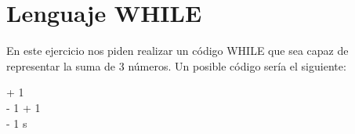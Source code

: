 \documentclass{article}
\begin{document}
\section{Lenguaje WHILE}

\begin{flushleft}
En este ejercicio nos piden realizar un código WHILE que sea capaz de representar la suma de 3 números. Un posible código sería el siguiente:
\end{flushleft}

 {
	 {
		\Assig{} + 1 \\
		\Assig{} - 1
	} 
	 {
		\Assig{} + 1 \\
		\Assig{} - 1
	}
	\Assig{}
}{s}
\end{document}
